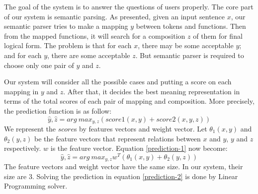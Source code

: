 \label{sec:system-overview}
The goal of the system is to answer the questions of users properly. The core part of our system is semantic parsing. As presented, given an input sentence $x$, our semantic parser tries to make a mapping $y$ between tokens and functions. Then from the mapped functions, it will search for a composition $z$ of them for final logical form. The problem is that for each $x$, there may be some acceptable $y$; and for each $y$, there are some acceptable $z$. But semantic parser is required to choose only one pair of $y$ and $z$. 

Our system will consider all the possible cases and putting a score on each mapping in $y$ and $z$. After that, it decides the best meaning representation in terms of the total scores of each pair of mapping and composition. More precisely, the prediction function is as follow:
\begin{equation}
\label{prediction-1}
\hat{y}, \hat{z} = arg \ max_{y,z} (score1(x, y) + score2(x,y,z) )
\end{equation}
We represent the $score$s by features vectors and weight vector. Let $\theta_1(x, y)$ and $\theta_2(y,z)$ be the feature vectors that represent relations between $x$ and $y$, $y$ and $z$ respectively. $w$ is the feature vector. Equation \ref{prediction-1} now become:
\begin{equation}
\label{prediction-2}
\hat{y}, \hat{z} = arg \ max_{y,z} w^T(\theta_1(x, y) + \theta_2(y,z) )
\end{equation}
The feature vectors and weight vector have the same size. In our system, their size are $3$. Solving the prediction in equation \ref{prediction-2} is done by Linear Programming solver. 

%
%
